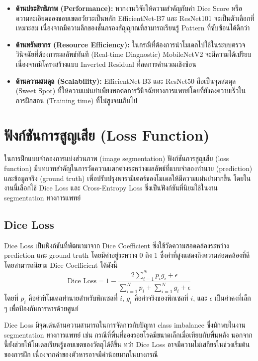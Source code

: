 \begin{itemize}
\item \textbf{ด้านประสิทธิภาพ (Performance):} หากงานวิจัยให้ความสำคัญกับค่า Dice Score หรือความละเอียดของขอบเขตอวัยวะเป็นหลัก EfficientNet-B7 และ ResNet101 จะเป็นตัวเลือกที่เหมาะสม เนื่องจากมีความลึกของชั้นกรองสัญญาณที่สามารถเรียนรู้ Pattern ที่ซับซ้อนได้ดีกว่า
\item \textbf{ด้านทรัพยากร (Resource Efficiency):} ในกรณีที่ต้องการนำโมเดลไปใช้ในระบบตรวจวินิจฉัยที่ต้องการผลลัพธ์ทันที (Real-time Diagnostic) MobileNetV2 จะมีความได้เปรียบเนื่องจากมีโครงสร้างแบบ Inverted Residual ที่ลดการคำนวณเชิงซ้อน
\item \textbf{ด้านความสมดุล (Scalability):} EfficientNet-B3 และ ResNet50 ถือเป็นจุดสมดุล (Sweet Spot) ที่ให้ความแม่นยำเพียงพอต่อการวินิจฉัยทางการแพทย์โดยที่ยังคงความเร็วในการฝึกสอน (Training time) ที่ไม่สูงจนเกินไป
\end{itemize}



\section{ฟังก์ชันการสูญเสีย (Loss Function)}
ในการฝึกแบบจำลองการแบ่งส่วนภาพ (image segmentation) ฟังก์ชันการสูญเสีย (loss function) มีบทบาทสำคัญในการวัดความแตกต่างระหว่างผลลัพธ์ที่แบบจำลองทำนาย (prediction) และข้อมูลจริง (ground truth) เพื่อปรับปรุงพารามิเตอร์ของโมเดลให้มีความแม่นยำมากขึ้น โดยในงานนี้เลือกใช้ Dice Loss และ Cross-Entropy Loss ซึ่งเป็นฟังก์ชันที่นิยมใช้ในงาน segmentation ทางการแพทย์ \cite{milletari2016vnet, sudre2017dice}

\subsection{Dice Loss}
Dice Loss เป็นฟังก์ชันที่พัฒนามาจาก Dice Coefficient ซึ่งใช้วัดความสอดคล้องระหว่าง prediction และ ground truth โดยมีค่าอยู่ระหว่าง 0 ถึง 1 ซึ่งค่าที่สูงแสดงถึงความสอดคล้องที่ดี โดยสามารถนิยาม Dice Coefficient ได้ดังนี้
\begin{equation}
\text{Dice Loss} = 1 - \frac{2 \sum_{i=1}^{N} p_i g_i + \epsilon}{\sum_{i=1}^{N} p_i + \sum_{i=1}^{N} g_i + \epsilon}
\end{equation}
โดยที่ $p_i$ คือค่าที่โมเดลทำนายสำหรับพิกเซลที่ $i$, $g_i$ คือค่าจริงของพิกเซลที่ $i$, และ $\epsilon$ เป็นค่าคงที่เล็ก ๆ เพื่อป้องกันการหารด้วยศูนย์

Dice Loss มีจุดเด่นด้านความสามารถในการจัดการกับปัญหา class imbalance ซึ่งมักพบในงาน segmentation ทางการแพทย์ เช่น กรณีที่พื้นที่ของรอยโรคมีขนาดเล็กเมื่อเทียบกับพื้นหลัง \cite{milletari2016vnet} นอกจากนี้ยังช่วยให้โมเดลเรียนรู้ขอบเขตของวัตถุได้ดีขึ้น
ทว่า Dice Loss อาจมีความไม่เสถียรในช่วงเริ่มต้นของการฝึก เนื่องจากค่าของตัวหารอาจมีค่าน้อยมากในบางกรณี

